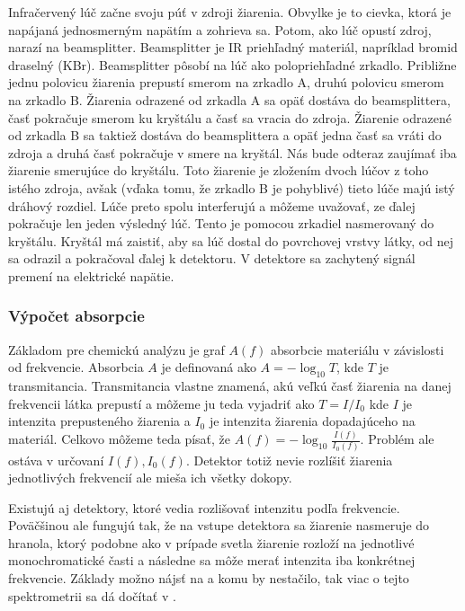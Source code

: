 Infračervený lúč začne svoju púť v zdroji žiarenia. Obvylke je to 
cievka, ktorá je napájaná jednosmerným napätím a zohrieva sa.
Potom, ako lúč opustí zdroj, narazí na beamsplitter. Beamsplitter
je IR priehľadný materiál, napríklad bromid draselný (KBr). 
Beamsplitter pôsobí
na lúč ako polopriehľadné zrkadlo. Približne jednu polovicu žiarenia
prepustí smerom na zrkadlo A, druhú polovicu smerom na zrkadlo B.
Žiarenia odrazené od zrkadla A sa opäť dostáva do beamsplittera,
časť pokračuje smerom ku kryštálu a časť sa vracia do zdroja.
Žiarenie odrazené od zrkadla B sa taktiež dostáva do beamsplittera a
opäť jedna časť sa vráti do zdroja a druhá časť pokračuje v smere na
kryštál. Nás bude odteraz zaujímať iba žiarenie smerujúce do kryštálu.
Toto žiarenie je zložením dvoch lúčov z toho istého zdroja, avšak
(vďaka tomu, že zrkadlo B je pohyblivé) tieto lúče majú istý
dráhový rozdiel. Lúče preto spolu interferujú a môžeme
uvažovať, ze ďalej pokračuje len jeden výsledný lúč.
Tento je pomocou zrkadiel nasmerovaný do kryštálu. Kryštál má zaistiť,
aby sa lúč dostal do povrchovej vrstvy látky, od nej sa odrazil a
pokračoval ďalej k detektoru. V detektore sa zachytený signál
premení na elektrické napätie.


\subsubsection{Výpočet absorpcie}

Základom pre chemickú analýzu je graf $A(f)$ absorbcie materiálu v
závislosti od frekvencie. 
Absorbcia $A$ je definovaná ako
$A=-\log_{10} T$, kde $T$ je transmitancia. Transmitancia vlastne
znamená, akú veľkú časť žiarenia na danej frekvencii látka prepustí
a môžeme ju teda vyjadriť ako $T=I/I_0$ kde $I$ je intenzita
prepusteného žiarenia a $I_0$ je intenzita žiarenia dopadajúceho na
materiál.
Celkovo môžeme teda písať, že $A(f) = -\log_{10} \frac{I(f)}{I_0(f)}$.
Problém ale ostáva v určovaní $I(f), I_0(f)$. Detektor totiž nevie rozlíšiť
žiarenia jednotlivých frekvencií ale mieša ich všetky dokopy.

\begin{poznamka}
    Existujú aj detektory, ktoré vedia rozlišovať intenzitu podľa
    frekvencie. Poväčšinou ale fungujú tak, že na vstupe detektora sa
    žiarenie nasmeruje do hranola, ktorý podobne ako v prípade svetla
    žiarenie rozloží na jednotlivé monochromatické časti a následne
    sa môže merať intenzita iba konkrétnej frekvencie. Základy možno
    nájsť na \cite{wiki:spectrometer} a komu by nestačilo, tak viac o tejto
    spektrometrii sa dá dočítať v \todo{}. 
\end{poznamka}



